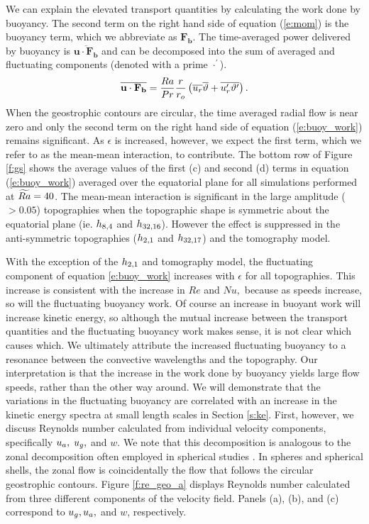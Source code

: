 We can explain the elevated transport quantities by calculating the work done by buoyancy.
The second term on the right hand side of equation (\ref{e:mom}) is the buoyancy term, which we abbreviate as $\mathbf{F_b}.$
The time-averaged power delivered by buoyancy is $\overline{\mathbf{u}\cdot\mathbf{F_{b}}}$ and can be decomposed into the sum of averaged and fluctuating components (denoted with a prime $\cdot^\prime$). 
\begin{equation}
	\overline{\mathbf{u}\cdot\mathbf{F_b}}
	= \frac{Ra}{Pr}\frac{r}{r_{o}}\left ( \overline{u_{r}}\overline{\vartheta} + \overline{u_{r}^{\prime}\vartheta^{\prime}} \right ) .
\label{e:buoy_work}
\end{equation}
When the geostrophic contours are circular, the time averaged radial flow is near zero and only the second term on the right hand side of equation (\ref{e:buoy_work}) remains significant. 
As $\epsilon$ is increased, however, we expect the first term, which we refer to as the mean-mean interaction, to contribute.
The bottom row of Figure \ref{f:gs} shows the average values of the first (c) and second (d) terms in equation (\ref{e:buoy_work}) averaged over the equatorial plane for all simulations performed at $\widetilde{Ra} = 40$.
The mean-mean interaction is significant in the large amplitude ($>0.05$) topographies when the topographic shape is symmetric about the equatorial plane (ie. $h_{8,4}$ and $h_{32,16}$). However the effect is suppressed in the anti-symmetric topographies ($h_{2,1}$ and $h_{32,17}$) and the tomography model.

With the exception of the $h_{2,1}$ and tomography model, the fluctuating component of equation \eqref{e:buoy_work} increases with $\epsilon$ for all topographies. 
This increase is consistent with the increase in $Re$ and $Nu,$ because as speeds increase, so will the fluctuating buoyancy work. Of course an increase in buoyant work will increase kinetic energy, so although the mutual increase between the transport quantities and the fluctuating buoyancy work makes sense, it is not clear which causes which. We ultimately attribute the increased fluctuating buoyancy to a resonance between the convective wavelengths and the topography. Our interpretation is that the increase in the work done by buoyancy yields large flow speeds, rather than the other way around.
We will demonstrate that the variations in the fluctuating buoyancy are correlated with an increase in the kinetic energy spectra at small length scales in Section \ref{s:ke}.
First, however, we discuss Reynolds number calculated from individual velocity components, specifically $u_{{a}},$ $u_{{g}},$ and $w.$
We note that this decomposition is analogous to the zonal decomposition often employed in spherical studies \citep[e.g.][]{pG78,uC02,jN24}.
In spheres and spherical shells, the zonal flow is coincidentally the flow that follows the circular geostrophic contours.  
Figure \ref{f:re_geo_a} displays Reynolds number calculated from three different components of the velocity field. Panels (a), (b), and (c) correspond to $u_{{g}},u_{{a}},$ and $w$, respectively. 

